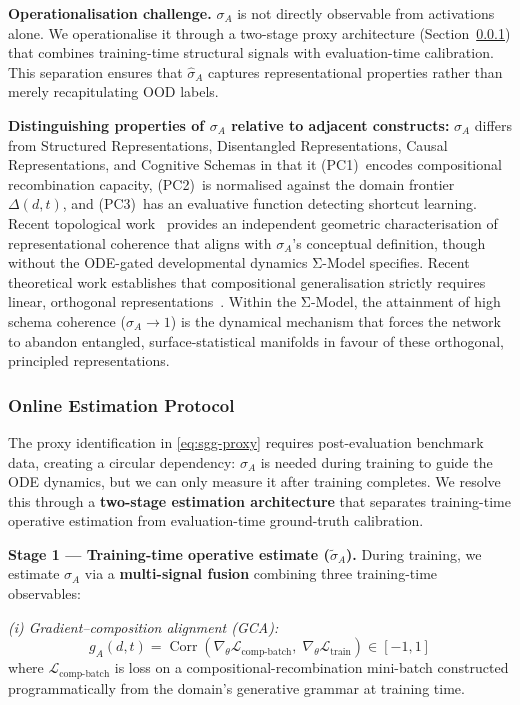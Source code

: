 \documentclass[11pt,a4paper]{article}
\DeclareMathOperator{\Corr}{Corr}
\begin{document}
\textbf{Operationalisation challenge.} $\sigma_A$ is not directly
observable from activations alone. We operationalise it through a
two-stage proxy architecture (Section~\ref{sec:online-estimation}) that
combines training-time structural signals with evaluation-time
calibration. This separation ensures that $\hat{\sigma}_A$ captures
representational properties rather than merely recapitulating OOD labels.

\textbf{Distinguishing properties of $\sigma_A$ relative to adjacent
constructs:} $\sigma_A$ differs from Structured Representations, Disentangled
Representations, Causal Representations, and Cognitive Schemas in that it (PC1)~encodes compositional
recombination capacity, (PC2)~is normalised against the domain frontier
$\Delta(d,t)$, and (PC3)~has an evaluative function detecting shortcut learning.
Recent topological work~\cite{gaukstad2026learningcoherent} provides an
independent geometric characterisation of representational coherence that
aligns with $\sigma_A$'s conceptual definition, though without the
ODE-gated developmental dynamics Σ-Model specifies. Recent theoretical work
establishes that compositional generalisation strictly requires linear,
orthogonal representations~\cite{uselis2026linear}. Within the Σ-Model, the
attainment of high schema coherence ($\sigma_A \to 1$) is the dynamical
mechanism that forces the network to abandon entangled, surface-statistical
manifolds in favour of these orthogonal, principled representations.

\subsubsection{Online Estimation Protocol}\label{sec:online-estimation}

The proxy identification in \eqref{eq:sgg-proxy} requires
post-evaluation benchmark data, creating a circular dependency: $\sigma_A$
is needed during training to guide the ODE dynamics, but we can only measure it after training completes. We resolve this through a \textbf{two-stage
estimation architecture} that separates training-time operative estimation
from evaluation-time ground-truth calibration.

\textbf{Stage 1 --- Training-time operative estimate ($\tilde{\sigma}_A$).}
During training, we estimate $\sigma_A$ via a \textbf{multi-signal fusion}
combining three training-time observables:

\textit{(i) Gradient--composition alignment (GCA):}
\begin{equation}\label{eq:gca}
g_A(d,t) = \Corr\!\left(\nabla_{\theta}\mathcal{L}_{\text{comp-batch}},\;\nabla_{\theta}\mathcal{L}_{\text{train}}\right) \in [-1,1]
\end{equation}
where $\mathcal{L}_{\text{comp-batch}}$ is loss on a compositional-recombination
mini-batch constructed programmatically from the domain's generative grammar
at training time.
\end{document}
